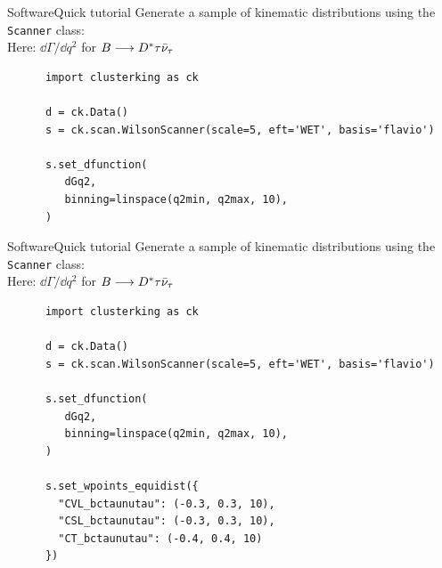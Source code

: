 \begin{frame}[t, fragile]{Software}{Quick tutorial}
    Generate a sample of kinematic distributions using the \texttt{Scanner} class:\\
    {\footnotesize Here: $\dd\Gamma/\dd q^2$ for $B\longrightarrow D^*\tau\bar\nu_\tau$}
    
    \begin{verbatim}
      import clusterking as ck
      
      d = ck.Data()
      s = ck.scan.WilsonScanner(scale=5, eft='WET', basis='flavio')
      
      s.set_dfunction(
         dGq2,
         binning=linspace(q2min, q2max, 10),
      )
    \end{verbatim}
\end{frame}

\begin{frame}[t, fragile]{Software}{Quick tutorial}
    Generate a sample of kinematic distributions using the \texttt{Scanner} class:\\
    {\footnotesize Here: $\dd\Gamma/\dd q^2$ for $B\longrightarrow D^*\tau\bar\nu_\tau$}
    
    \begin{verbatim}
      import clusterking as ck
      
      d = ck.Data()
      s = ck.scan.WilsonScanner(scale=5, eft='WET', basis='flavio')
      
      s.set_dfunction(
         dGq2,
         binning=linspace(q2min, q2max, 10),
      )
      
      s.set_wpoints_equidist({
        "CVL_bctaunutau": (-0.3, 0.3, 10),
        "CSL_bctaunutau": (-0.3, 0.3, 10),
        "CT_bctaunutau": (-0.4, 0.4, 10)
      })
    \end{verbatim}
\end{frame}


